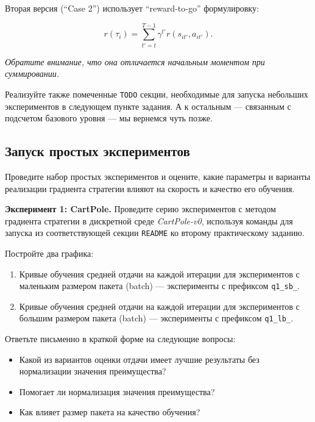 \documentclass[12pt, oneside]{article}
\begin{document}
\noindent
Вторая версия (``Case 2'') использует ``reward-to-go'' формулировку:

\begin{equation}
    r(\tau_i) = \sum_{t' = t}^{T - 1} {\gamma^{t'} r(s_{it'}, a_{it'})}.
\end{equation}

\noindent
\textit{Обратите внимание, что она отличается начальным моментом при суммировании.}

Реализуйте также помеченные \verb|TODO| секции, необходимые для запуска небольших экспериментов в следующем пункте задания. А к остальным --- связанным с подсчетом базового уровня --- мы вернемся чуть позже.

\subsection{Запуск простых экспериментов}

Проведите набор простых экспериментов и оцените, какие параметры и варианты реализации градиента стратегии влияют на скорость и качество его обучения.

\textbf{Эксперимент 1: CartPole.} Проведите серию экспериментов с методом градиента стратегии в дискретной среде \textit{CartPole-v0}, используя команды для запуска из соответствующей секции \verb|README| ко второму практическому заданию.

Постройте два графика:

\begin{enumerate}
    \item Кривые обучения средней отдачи на каждой итерации для экспериментов с маленьким размером пакета (batch) --- эксперименты с префиксом \verb|q1_sb_|.
    \item Кривые обучения средней отдачи на каждой итерации для экспериментов с большим размером пакета (batch) --- эксперименты с префиксом \verb|q1_lb_|.
\end{enumerate}

Ответьте письменно в краткой форме на следующие вопросы:

\begin{itemize}
    \item Какой из вариантов оценки отдачи имеет лучшие результаты без нормализации значения преимущества?
    \item Помогает ли нормализация значения преимущества?
    \item Как влияет размер пакета на качество обучения?
\end{itemize}
\end{document}
